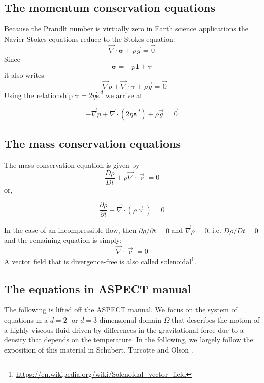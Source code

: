 \subsection{The momentum conservation equations} 

Because the Prandlt number is virtually zero in Earth science applications the Navier Stokes 
equations reduce to the Stokes equation:
\begin{equation}
{\vec \nabla}\cdot {\bm \sigma} + \rho {\vec g} = \vec{0}
\end{equation}
Since 
\begin{equation}
{\bm \sigma} = -p {\bm 1} + {\bm \tau}
\end{equation}
it also writes
\begin{equation}
-{\vec \nabla}p + {\vec \nabla}\cdot {\bm \tau} + \rho {\vec g} = \vec{0}
\end{equation}
Using the relationship ${\bm \tau} = 2 \eta \dot{\bm \varepsilon}^d$ we arrive at 
\begin{mdframed}[backgroundcolor=blue!5]
\begin{equation}
-{\vec \nabla}p + {\vec \nabla}\cdot (2 \eta \dot{\bm \varepsilon}^d ) + \rho {\vec g} = \vec{0}
\end{equation}
\end{mdframed}

\subsection{The mass conservation equations} 
 

The mass conservation equation is given by
\[
\frac{D\rho}{Dt} + \rho {\vec \nabla}\cdot{\vec \upnu} = 0
\]
or, 
\begin{mdframed}[backgroundcolor=blue!5]
\[
\frac{\partial \rho}{\partial t} + {\vec \nabla}\cdot(\rho {\vec \upnu}) = 0
\]
\end{mdframed}
In the case of an incompressible flow, then $\partial \rho/\partial t=0$ and 
${\vec \nabla}\rho=0$, i.e. $D\rho/Dt=0$ and the remaining equation is simply:
\[
{\vec \nabla}\cdot{\vec \upnu} = 0
\]
A vector field that is divergence-free is also called 
solenoidal\footnote{\url{https://en.wikipedia.org/wiki/Solenoidal_vector_field}}.


\subsection{The equations in ASPECT manual}
The following is lifted off the ASPECT manual.
We focus on the system of equations in a $d=2$- or $d=3$-dimensional
domain $\Omega$ that describes the motion of a highly viscous fluid driven
by differences in the gravitational force due to a density that depends on
the temperature. In the following, we largely follow the exposition of this
material in Schubert, Turcotte and Olson \cite{scto01}.

